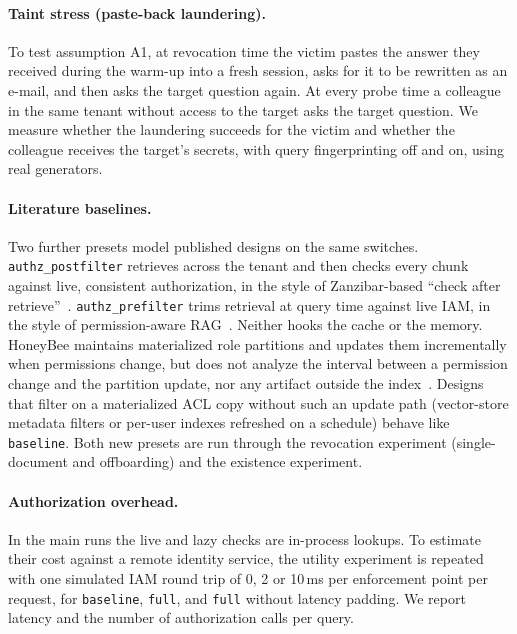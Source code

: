 \paragraph{Taint stress (paste-back laundering).}
To test assumption A1, at revocation time the victim pastes the answer they received during the warm-up into a fresh session, asks for it to be rewritten as an e-mail, and then asks the target question again. At every probe time a colleague in the same tenant without access to the target asks the target question. We measure whether the laundering succeeds for the victim and whether the colleague receives the target's secrets, with query fingerprinting off and on, using real generators.

\paragraph{Literature baselines.}
Two further presets model published designs on the same switches. \texttt{authz\_postfilter} retrieves across the tenant and then checks every chunk against live, consistent authorization, in the style of Zanzibar-based ``check after retrieve''~\cite{pang2019zanzibar}. \texttt{authz\_prefilter} trims retrieval at query time against live IAM, in the style of permission-aware RAG~\cite{jeong2025permissionrag}. Neither hooks the cache or the memory. HoneyBee maintains materialized role partitions and updates them incrementally when permissions change, but does not analyze the interval between a permission change and the partition update, nor any artifact outside the index~\cite{zhong2026honeybee}. Designs that filter on a materialized ACL copy without such an update path (vector-store metadata filters or per-user indexes refreshed on a schedule) behave like \texttt{baseline}. Both new presets are run through the revocation experiment (single-document and offboarding) and the existence experiment.

\paragraph{Authorization overhead.}
In the main runs the live and lazy checks are in-process lookups. To estimate their cost against a remote identity service, the utility experiment is repeated with one simulated IAM round trip of 0, 2 or 10\,ms per enforcement point per request, for \texttt{baseline}, \texttt{full}, and \texttt{full} without latency padding. We report latency and the number of authorization calls per query.

